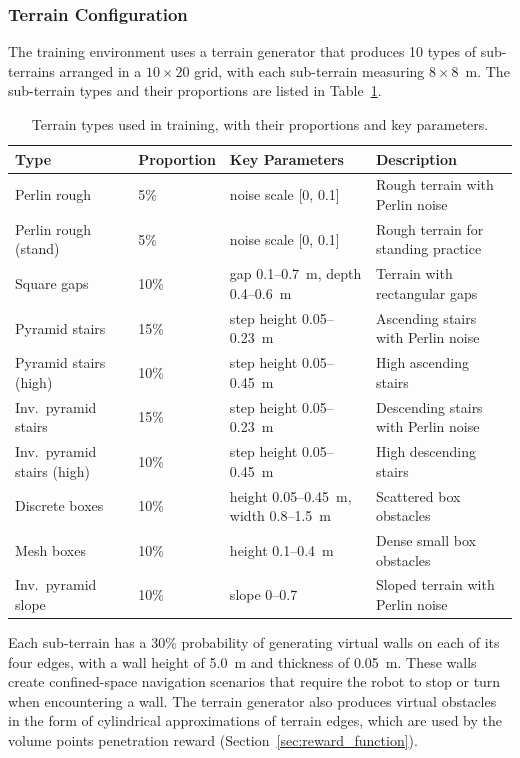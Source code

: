 \subsubsection{Terrain Configuration}

The training environment uses a terrain generator that produces 10 types of sub-terrains arranged in a $10 \times 20$ grid, with each sub-terrain measuring $8 \times 8$~m. The sub-terrain types and their proportions are listed in Table~\ref{tab:terrain_types}.

\begin{table}[t]
\centering
\caption{Terrain types used in training, with their proportions and key parameters.}
\label{tab:terrain_types}
\footnotesize
\begin{tabular}{@{}lp{1.5cm}p{4cm}p{4.5cm}@{}}
\toprule
\textbf{Type} & \textbf{Proportion} & \textbf{Key Parameters} & \textbf{Description} \\
\midrule
Perlin rough & 5\% & noise scale [0, 0.1] & Rough terrain with Perlin noise \\
Perlin rough (stand) & 5\% & noise scale [0, 0.1] & Rough terrain for standing practice \\
Square gaps & 10\% & gap 0.1--0.7~m, depth 0.4--0.6~m & Terrain with rectangular gaps \\
Pyramid stairs & 15\% & step height 0.05--0.23~m & Ascending stairs with Perlin noise \\
Pyramid stairs (high) & 10\% & step height 0.05--0.45~m & High ascending stairs \\
Inv.\ pyramid stairs & 15\% & step height 0.05--0.23~m & Descending stairs with Perlin noise \\
Inv.\ pyramid stairs (high) & 10\% & step height 0.05--0.45~m & High descending stairs \\
Discrete boxes & 10\% & height 0.05--0.45~m, width 0.8--1.5~m & Scattered box obstacles \\
Mesh boxes & 10\% & height 0.1--0.4~m & Dense small box obstacles \\
Inv.\ pyramid slope & 10\% & slope 0--0.7 & Sloped terrain with Perlin noise \\
\bottomrule
\end{tabular}
\end{table}

Each sub-terrain has a 30\% probability of generating virtual walls on each of its four edges, with a wall height of 5.0~m and thickness of 0.05~m. These walls create confined-space navigation scenarios that require the robot to stop or turn when encountering a wall. The terrain generator also produces virtual obstacles in the form of cylindrical approximations of terrain edges, which are used by the volume points penetration reward (Section~\ref{sec:reward_function}).

